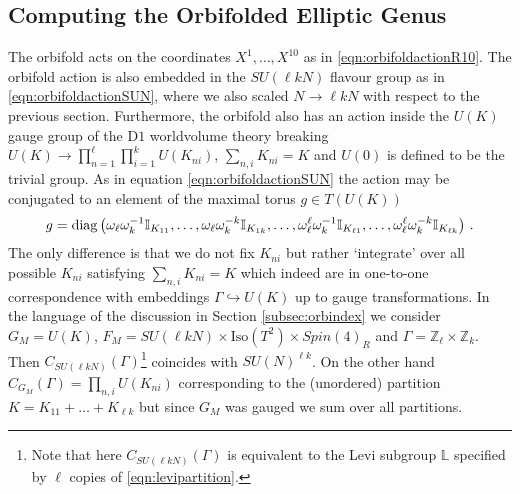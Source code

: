 \documentclass[main.tex]{subfiles}
\begin{document}
\subsection{Computing the Orbifolded Elliptic Genus}
The orbifold acts on the coordinates $X^1,\dots,X^{10}$ as in \eqref{eqn:orbifoldactionR10}. The orbifold action is also embedded in the $SU(\ell kN)$ flavour group as in \eqref{eqn:orbifoldactionSUN}, where we also scaled $N\to \ell kN$ with respect to the previous section. Furthermore, the orbifold also has an action inside the $U(K)$ gauge group of the D$1$ worldvolume theory breaking $U(K)\to\prod_{n=1}^{\ell}\prod_{i=1}^kU(K_{ni})$, $\sum_{n,i}K_{ni}=K$ and $U(0)$ is defined to be the trivial group. As in equation \eqref{eqn:orbifoldactionSUN} the action may be conjugated to an element of the maximal torus $g\in T(U(K))$
\begin{equation}\label{eqn:orbifoldactionUK}
g=\operatorname{diag}\left(\omega_{\ell}\omega_k^{-1}\mathbb{I}_{K_{11}},\dots,\omega_{\ell}\omega_k^{-k}\mathbb{I}_{K_{1k}},\dots,\omega^{\ell}_{\ell}\omega_k^{-1}\mathbb{I}_{K_{\ell 1}},\dots, \omega_{\ell}^{\ell}\omega^{-k}_k\mathbb{I}_{K_{\ell k}}\right)\,.
\end{equation}
The only difference is that we do not fix $K_{ni}$ but rather `integrate' over all possible $K_{ni}$ satisfying $\sum_{n,i}K_{ni}=K$ which indeed are in one-to-one correspondence with embeddings $\Gamma\hookrightarrow U(K)$ up to gauge transformations. In the language of the discussion in Section \ref{subsec:orbindex} we consider $G_M=U(K)$, $F_M=SU\left(\ell kN\right)\times \mathrm{Iso}\left(T^2\right)\times Spin(4)_R$ and $\Gamma=\mathbb{Z}_{\ell}\times\mathbb{Z}_k$. Then $C_{SU(\ell kN)}\left(\Gamma\right)$\footnote{Note that here $C_{SU(\ell kN)}\left(\Gamma\right)$ is equivalent to the Levi subgroup $\mathbb{L}$ specified by $\ell$ copies of \eqref{eqn:levipartition}.} coincides with $SU(N)^{\ell k}$. On the other hand $C_{G_M}(\Gamma)=\prod_{n,i}U(K_{ni})$ corresponding to the (unordered) partition $K=K_{11}+\dots+K_{\ell k}$ but since $G_M$ was gauged we sum over all partitions.
\end{document}
